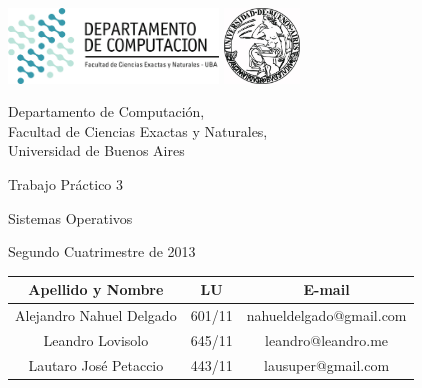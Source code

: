 \documentclass[a4paper,10pt,twoside]{article}
\begin{document}


\thispagestyle{caratula}

\begin{center}

\includegraphics[height=2cm]{DC.png} 
\hfill
\includegraphics[height=2cm]{UBA.jpg} 

\vspace{2cm}

Departamento de Computación,\\
Facultad de Ciencias Exactas y Naturales,\\
Universidad de Buenos Aires

\vspace{4cm}

\begin{Huge}
Trabajo Práctico 3
\end{Huge}

\vspace{0.5cm}

\begin{Large}
Sistemas Operativos
\end{Large}

\vspace{1cm}

Segundo Cuatrimestre de 2013

\vspace{4cm}

\begin{tabular}{|c|c|c|}
\hline
Apellido y Nombre & LU & E-mail\\
\hline
Alejandro Nahuel Delgado & 601/11 & nahueldelgado@gmail.com\\
Leandro Lovisolo         & 645/11 & leandro@leandro.me\\
Lautaro José Petaccio    & 443/11 & lausuper@gmail.com\\
\hline
\end{tabular}

\end{center}
\end{document}
